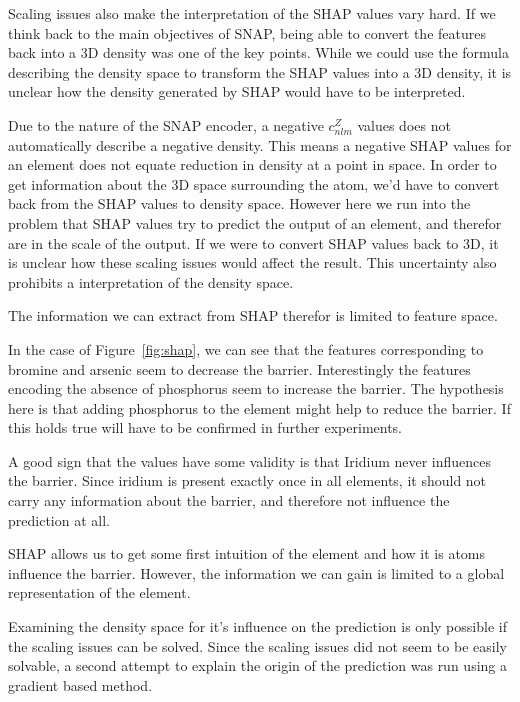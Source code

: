 Scaling issues also make the interpretation of the SHAP values vary hard.
If we think back to the main objectives of SNAP, being able to convert the features back into 
a 3D density was one of the key points.
While we could use the formula describing the density space to transform the SHAP values 
into a 3D density, it is unclear how the density generated by SHAP would have to be interpreted.

Due to the nature of the SNAP encoder, a negative $c_{nlm}^Z$ values does not automatically 
describe a negative density.
This means a negative SHAP values for an element does not equate reduction in density
at a point in space.
In order to get information about the 3D space surrounding the atom, we'd have to convert back from 
the SHAP values to density space.
However here we run into the problem that SHAP values try to predict the output
of an element, and therefor are in the scale of the output.
If we were to convert SHAP values back to 3D, it is unclear how these scaling issues would 
affect the result. 
This uncertainty also prohibits a interpretation of the density space.

The information we can extract from SHAP therefor is limited to feature space.

In the case of Figure~\ref{fig:shap}, we can see that the features corresponding to bromine and arsenic seem to decrease the barrier.
Interestingly the features encoding the absence of phosphorus seem to increase the barrier.
The hypothesis here is that adding phosphorus to the element might help to reduce
the barrier.
If this holds true will have to be confirmed in further experiments.

A good sign that the values have some validity is that Iridium never influences the barrier.
Since iridium is present exactly once in all elements, it should not carry any information about the barrier,
and therefore not influence the prediction at all.

SHAP allows us to get some first intuition of the element and how it is atoms influence the barrier.
However, the information we can gain is limited to a global representation of the element.

Examining the density space for it's influence on the prediction is only possible if the scaling
issues can be solved.
Since the scaling issues did not seem to be easily solvable, a second attempt to explain the origin of the prediction
was run using a gradient based method.

